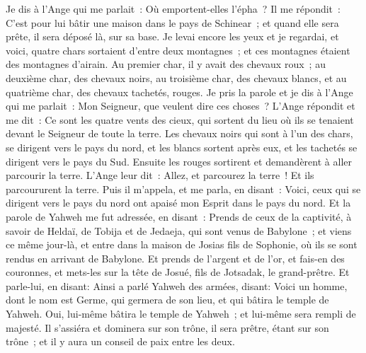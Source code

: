 \begin{multicols}{2}
Je dis à l'Ange qui me parlait~: Où emportent-elles l'épha~?
Il me répondit~: C'est pour lui bâtir une maison dans le pays de Schinear~; et quand elle sera prête, il sera déposé là, sur sa base.
\VerseOne{}Je levai encore les yeux et je regardai, et voici, quatre chars sortaient d'entre deux montagnes~; et ces montagnes étaient des montagnes d'airain.
Au premier char, il y avait des chevaux roux~; au deuxième char, des chevaux noirs,
au troisième char, des chevaux blancs, et au quatrième char, des chevaux tachetés, rouges.
Je pris la parole et je dis à l'Ange qui me parlait~: Mon Seigneur, que veulent dire ces choses~?
L'Ange répondit et me dit~: Ce sont les quatre vents des cieux, qui sortent du lieu où ils se tenaient devant le Seigneur de toute la terre.
Les chevaux noirs qui sont à l'un des chars, se dirigent vers le pays du nord, et les blancs sortent après eux, et les tachetés se dirigent vers le pays du Sud.
Ensuite les rouges sortirent et demandèrent à aller parcourir la terre. L'Ange leur dit~: Allez, et parcourez la terre~! Et ils parcoururent la terre.
Puis il m'appela, et me parla, en disant~: Voici, ceux qui se dirigent vers le pays du nord ont apaisé mon Esprit dans le pays du nord.
Et la parole de Yahweh me fut adressée, en disant~:
Prends de ceux de la captivité, à savoir de Heldaï, de Tobija et de Jedaeja, qui sont venus de Babylone~; et viens ce même jour-là, et entre dans la maison de Josias fils de Sophonie, où ils se sont rendus en arrivant de Babylone.
Et prends de l'argent et de l'or, et fais-en des couronnes, et mets-les sur la tête de Josué, fils de Jotsadak, le grand-prêtre.
Et parle-lui, en disant: Ainsi a parlé Yahweh des armées, disant: Voici un homme, dont le nom est Germe, qui germera de son lieu, et qui bâtira le temple de Yahweh.
Oui, lui-même bâtira le temple de Yahweh~; et lui-même sera rempli de majesté. Il s'assiéra et dominera sur son trône, il sera prêtre, étant sur son trône~; et il y aura un conseil de paix entre les deux.

\end{multicols}
